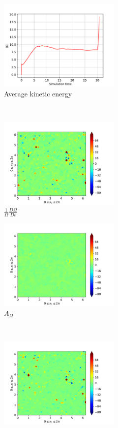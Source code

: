 \begin{figure}[H]
    \begin{subfigure}[H]{0.45\textwidth}
        \includegraphics[height=1.75in]{media/run-cds-65/enst-average1380}
        \caption{Average kinetic energy}
    \end{subfigure}
    ~
    \begin{subfigure}[H]{0.45\textwidth}
        \includegraphics[height=1.75in]{media/run-cds-65/enst-1380}
        \caption{$\frac{1}{\Omega} \frac{D \Omega}{Dt}$}
    \end{subfigure}
    \newline
    \begin{subfigure}{0.45\textwidth}
        \includegraphics[height=1.75in]{media/run-cds-65/A-enst-1380}
        \caption{$A_{\Omega}$}
    \end{subfigure}
    ~
    \begin{subfigure}{0.45\textwidth}
        \includegraphics[height=1.75in]{media/run-cds-65/Pi-enst-1380}

\end{subfigure}
\end{figure}
